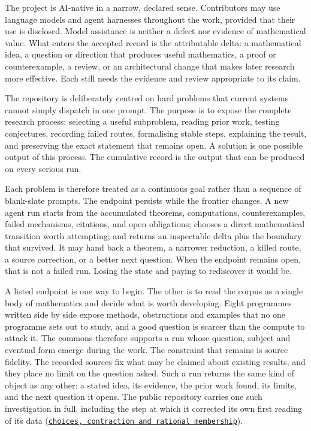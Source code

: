 \documentclass[10pt]{article}
\newcommand{\repobase}{https://github.com/wcook04/plectis-erdos}
\newcommand{\repolink}[2]{\href{\repobase/blob/1d70482583cc9c662cd3b86f66d75c54bb405aa6/#1}{\texttt{#2}}}
\begin{document}
The project is AI-native in a narrow, declared sense.  Contributors may use
language models and agent harnesses throughout the work, provided that their
use is disclosed.  Model assistance is neither a defect nor evidence of
mathematical value.  What enters the accepted record is the attributable
delta: a mathematical idea, a question or direction that produces useful
mathematics, a proof or counterexample, a review, or an architectural change
that makes later research more effective.  Each still needs the evidence and
review appropriate to its claim.

The repository is deliberately centred on hard problems that current systems
cannot simply dispatch in one prompt.  The purpose is to expose the complete
research process: selecting a useful subproblem, reading prior work, testing
conjectures, recording failed routes, formalising stable steps, explaining the
result, and preserving the exact statement that remains open.  A solution is
one possible output of this process.  The cumulative record is the output that
can be produced on every serious run.

Each problem is therefore treated as a continuous goal rather than a sequence
of blank-slate prompts.  The endpoint persists while the frontier changes.  A
new agent run starts from the accumulated theorems, computations,
counterexamples, failed mechanisms, citations, and open obligations; chooses a
direct mathematical transition worth attempting; and returns an inspectable
delta plus the boundary that survived.  It may hand back a theorem, a narrower
reduction, a killed route, a source correction, or a better next question.
When the endpoint remains open, that is not a failed run.  Losing the state and
paying to rediscover it would be.

A listed endpoint is one way to begin.  The other is to read the corpus as a
single body of mathematics and decide what is worth developing.  Eight
programmes written side by side expose methods, obstructions and examples that
no one programme sets out to study, and a good question is scarcer than the
compute to attack it.  The commons therefore supports a run whose question,
subject and eventual form emerge during the work.  The constraint that remains
is source fidelity.  The recorded sources fix what may be claimed about
existing results, and they place no limit on the question asked.  Such a run
returns the same kind of object as any other: a stated idea, its evidence, the
prior work found, its limits, and the next question it opens.  The public
repository carries one such investigation in full, including the step at which
it corrected its own first reading of its data
(\repolink{research/experiments/choices_contraction/README.md}{choices,
contraction and rational membership}).
\end{document}
